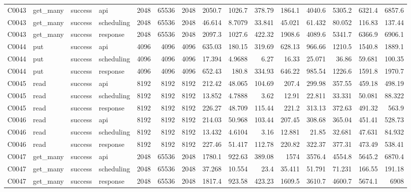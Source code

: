 \begin{landscape}
\begin{longtable}{llllrrrrrrrrrrr}
C0043 & get\_\allowbreak{}many & success & api & 2048 & 65536 & 2048 & 2050.7 & 1026.7 & 378.79 & 1864.1 & 4040.6 & 5305.2 & 6321.4 & 6857.6\\
C0043 & get\_\allowbreak{}many & success & scheduling & 2048 & 65536 & 2048 & 46.614 & 8.7079 & 33.841 & 45.021 & 61.432 & 80.052 & 116.83 & 137.44\\
C0043 & get\_\allowbreak{}many & success & response & 2048 & 65536 & 2048 & 2097.3 & 1027.6 & 422.32 & 1908.6 & 4089.6 & 5341.7 & 6366.9 & 6906.1\\
C0044 & put & success & api & 4096 & 4096 & 4096 & 635.03 & 180.15 & 319.69 & 628.13 & 966.66 & 1210.5 & 1540.8 & 1889.1\\
C0044 & put & success & scheduling & 4096 & 4096 & 4096 & 17.394 & 4.9688 & 6.27 & 16.33 & 25.071 & 36.86 & 59.681 & 100.35\\
C0044 & put & success & response & 4096 & 4096 & 4096 & 652.43 & 180.8 & 334.93 & 646.22 & 985.54 & 1226.6 & 1591.8 & 1970.7\\
C0045 & read & success & api & 8192 & 8192 & 8192 & 212.42 & 48.065 & 104.69 & 207.4 & 299.98 & 357.55 & 459.18 & 498.19\\
C0045 & read & success & scheduling & 8192 & 8192 & 8192 & 13.852 & 4.7888 & 3.62 & 12.91 & 22.811 & 33.331 & 50.081 & 88.322\\
C0045 & read & success & response & 8192 & 8192 & 8192 & 226.27 & 48.709 & 115.44 & 221.2 & 313.13 & 372.63 & 491.32 & 563.9\\
C0046 & read & success & api & 8192 & 8192 & 8192 & 214.03 & 50.968 & 103.44 & 207.45 & 308.68 & 365.04 & 451.41 & 528.73\\
C0046 & read & success & scheduling & 8192 & 8192 & 8192 & 13.432 & 4.6104 & 3.16 & 12.881 & 21.85 & 32.681 & 47.631 & 84.932\\
C0046 & read & success & response & 8192 & 8192 & 8192 & 227.46 & 51.417 & 112.78 & 220.82 & 322.37 & 377.31 & 473.49 & 538.41\\
C0047 & get\_\allowbreak{}many & success & api & 2048 & 65536 & 2048 & 1780.1 & 922.63 & 389.08 & 1574 & 3576.4 & 4554.8 & 5645.2 & 6870.4\\
C0047 & get\_\allowbreak{}many & success & scheduling & 2048 & 65536 & 2048 & 37.268 & 10.554 & 23.4 & 35.411 & 51.791 & 71.231 & 166.55 & 191.18\\
C0047 & get\_\allowbreak{}many & success & response & 2048 & 65536 & 2048 & 1817.4 & 923.58 & 423.23 & 1609.5 & 3610.7 & 4600.7 & 5674.1 & 6908\\

\end{longtable}
\end{landscape}
